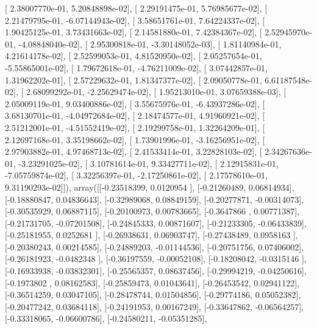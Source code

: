 \documentclass{article}
\begin{document}
       [  2.38007770e-01,   5.20848898e-02],
       [  2.29191475e-01,   5.76985677e-02],
       [  2.21479795e-01,  -6.07144943e-02],
       [  3.58651761e-01,   7.64224337e-02],
       [  1.90425125e-01,   3.73431663e-02],
       [  2.14581880e-01,   7.42384367e-02],
       [  2.52945970e-01,  -4.08848040e-02],
       [  2.95300818e-01,  -3.30148052e-03],
       [  1.81140984e-01,   4.21614178e-02],
       [  2.52599053e-01,   4.81520950e-02],
       [  2.05257654e-01,  -5.55865001e-02],
       [  1.79672618e-01,  -4.76211009e-02],
       [  3.07442857e-01,   1.31962202e-01],
       [  2.57229632e-01,   1.81347377e-02],
       [  2.09050778e-01,   6.61187548e-02],
       [  2.68099292e-01,  -2.25629474e-02],
       [  1.95213010e-01,   3.07659388e-03],
       [  2.05009119e-01,   9.03400886e-02],
       [  3.55675976e-01,  -6.43937286e-02],
       [  3.68130701e-01,  -4.04972684e-02],
       [  2.18474577e-01,   4.91960921e-02],
       [  2.51212001e-01,  -4.51552419e-02],
       [  2.19299758e-01,   1.32264209e-01],
       [  2.12697168e-01,   3.35198662e-02],
       [  1.73901996e-01,  -3.16256951e-02],
       [  2.97903882e-01,   4.97468713e-02],
       [  2.41533414e-01,   3.22828103e-02],
       [  2.34267636e-01,  -3.23291025e-02],
       [  3.10781614e-01,   9.33427711e-02],
       [  2.12915831e-01,  -7.05759874e-02],
       [  3.32256397e-01,  -2.17250861e-02],
       [  2.17578610e-01,   9.31190293e-02]]), array([[-0.23518399,  0.0120954 ],
       [-0.21260489,  0.06814934],
       [-0.18880847,  0.04836643],
       [-0.32989068,  0.08849159],
       [-0.20277871, -0.00314073],
       [-0.30535929,  0.06887115],
       [-0.20100973,  0.00783665],
       [-0.3647866 ,  0.00771387],
       [-0.21731705, -0.07201508],
       [-0.24845333,  0.00871607],
       [-0.21233305, -0.06433839],
       [-0.25181955,  0.0252681 ],
       [-0.26938631,  0.06903747],
       [-0.27438489,  0.0958163 ],
       [-0.20380243,  0.00214585],
       [-0.24889203, -0.01144536],
       [-0.20751756,  0.07406002],
       [-0.26181923, -0.0482348 ],
       [-0.36197559, -0.00052108],
       [-0.18208042, -0.0315146 ],
       [-0.16933938, -0.03832301],
       [-0.25565357,  0.08637456],
       [-0.29994219, -0.04250616],
       [-0.1973802 ,  0.08162583],
       [-0.25859473,  0.01043641],
       [-0.26453542,  0.02941122],
       [-0.36514259,  0.03047105],
       [-0.28478744,  0.01504856],
       [-0.29774186,  0.05052382],
       [-0.20477242,  0.03684118],
       [-0.24191953,  0.00167249],
       [-0.33647862, -0.06564257],
       [-0.33318065, -0.06600786],
       [-0.24580211, -0.05351285],
\end{document}
